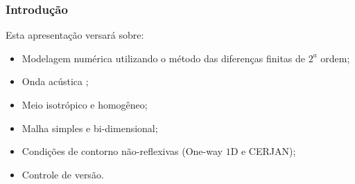 \documentclass[10pt]{beamer} %
\begin{document}
\begin{frame}
	\frametitle{Introdução}
	\transboxin%
	\begin{block}{Esta apresentação versará sobre:}
		\begin{itemize}
			\pause
			\item Modelagem numérica utilizando o método das diferenças finitas de $2^{a}$ ordem;
			\pause %
			\item Onda acústica ;
			\pause
			\item Meio isotrópico e homogêneo;
			\pause
			\item Malha simples e bi-dimensional;
			\pause
			\item Condições de contorno não-reflexivas (One-way $1$D e CERJAN);
			\pause
			\item Controle de versão.
			
			
		\end{itemize}	
	\end{block}
	
\end{frame}






	
	
	
%
%


\end{document}
